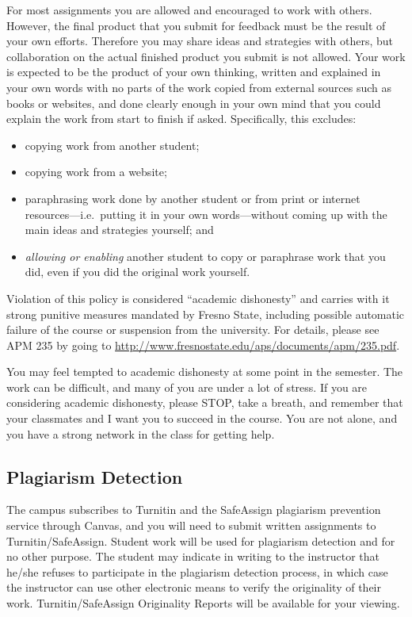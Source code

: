 For most assignments you are allowed and encouraged to work with others.
However, the final product that you submit for feedback must be the
result of your own efforts. Therefore you may share ideas and strategies
with others, but collaboration on the actual finished product you submit
is not allowed. Your work is expected to be the product of your own
thinking, written and explained in your own words with no parts of the
work copied from external sources such as books or websites, and done
clearly enough in your own mind that you could explain the work from
start to finish if asked. Specifically, this excludes:

\begin{itemize}
\tightlist
\item
  copying work from another student;
\item
  copying work from a website;
\item
  paraphrasing work done by another student or from print or internet
  resources---i.e.~putting it in your own words---without coming up with
  the main ideas and strategies yourself; and
\item
  \emph{allowing or enabling} another student to copy or paraphrase work
  that you did, even if you did the original work yourself.
\end{itemize}

Violation of this policy is considered ``academic dishonesty'' and
carries with it strong punitive measures mandated by Fresno State,
including possible automatic failure of the course or suspension from
the university. For details, please see APM 235 by going to
\url{http://www.fresnostate.edu/aps/documents/apm/235.pdf}.

You may feel tempted to academic dishonesty at some point in the
semester. The work can be difficult, and many of you are under a lot of
stress. If you are considering academic dishonesty, please STOP, take a
breath, and remember that your classmates and I want you to succeed in
the course. You are not alone, and you have a strong network in the
class for getting help.

\hypertarget{plagiarism-detection}{%
\subsection{Plagiarism Detection}\label{plagiarism-detection}}

The campus subscribes to Turnitin and the SafeAssign plagiarism
prevention service through Canvas, and you will need to submit written
assignments to Turnitin/SafeAssign. Student work will be used for
plagiarism detection and for no other purpose. The student may indicate
in writing to the instructor that he/she refuses to participate in the
plagiarism detection process, in which case the instructor can use other
electronic means to verify the originality of their work.
Turnitin/SafeAssign Originality Reports will be available for your
viewing.

